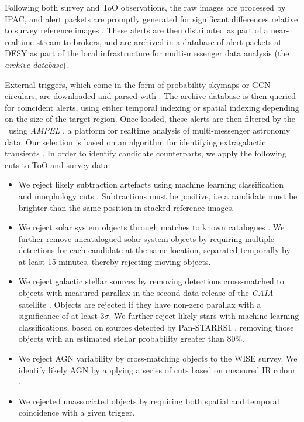 Following both survey and ToO observations, the raw images are processed by IPAC, and alert packets are promptly generated for significant differences relative to survey reference images . These alerts are then distributed as part of a near-realtime stream to brokers, and are archived in a database of alert packets at DESY as part of the local infrastructure for multi-messenger data analysis (the \emph{archive database}).

External triggers, which come in the form of probability skymaps or GCN circulars, are downloaded and parsed with \ztf. The archive database is then queried for coincident alerts, using either temporal indexing or spatial indexing depending on the size of the target region. Once loaded, these alerts are then filtered by the \ztf~using \emph{AMPEL} , a platform for realtime analysis of multi-messenger astronomy data. Our selection is based on an algorithm for identifying extragalactic transients \cite{ampel}. In order to identify candidate counterparts, we apply the following cuts to ToO and survey data:

\begin{itemize}
	\item We reject likely subtraction artefacts using machine learning classification and morphology cuts . Subtractions must be positive, i.e a candidate must be brighter than the same position in stacked reference images.
	\item We reject solar system objects through matches to known catalogues \cite{ztf_ml_19}. We further remove uncatalogued solar system objects by requiring multiple detections for each candidate at the same location, separated temporally by at least 15 minutes, thereby rejecting moving objects.
	\item We reject galactic stellar sources by removing detections cross-matched to objects with measured parallax in the second data release of the \emph{GAIA} satellite . Objects are rejected if they have non-zero parallax with a significance of at least 3$\sigma$. We further reject likely stars with machine learning classifications, based on sources detected by Pan-STARRS1 , removing those objects with an estimated stellar probability greater than 80\%. 
	\item We reject AGN variability by cross-matching objects to the WISE survey. We identify likely AGN by applying a series of cuts based on measured IR colour .
	\item We rejected unassociated objects by requiring both spatial and temporal coincidence with a given trigger.
\end{itemize}

